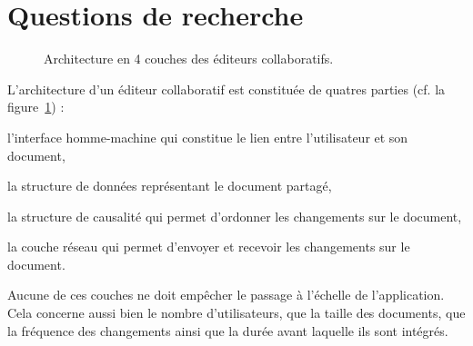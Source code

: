 
\section{Questions de recherche}

\begin{figure}
  \centering
  
  \caption{\label{intro:fig:architecture} Architecture en 4 couches des éditeurs
    collaboratifs.}
\end{figure}

L'architecture d'un éditeur collaboratif est constituée de quatres parties
(cf. la figure~\ref{intro:fig:architecture}) :
\begin{inparaenum}[(i)]
\item l'interface homme-machine qui constitue le lien entre l'utilisateur et son
  document, 
\item la structure de données représentant le document partagé,
\item la structure de causalité qui permet d'ordonner les changements sur le
  document,
\item la couche réseau qui permet d'envoyer et recevoir les changements sur le
  document.
\end{inparaenum}

Aucune de ces couches ne doit empêcher le passage à l'échelle de l'application.
Cela concerne aussi bien le nombre d'utilisateurs, que la taille des documents,
que la fréquence des changements ainsi que la durée avant laquelle ils sont
intégrés.

